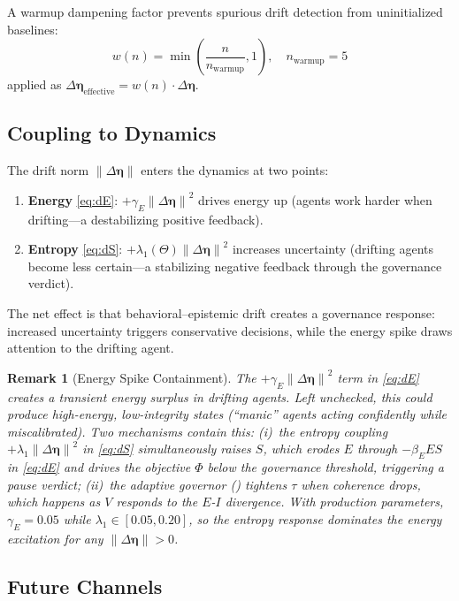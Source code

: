 \documentclass[11pt,twocolumn]{article}
\newtheorem{remark}[theorem]{Remark}
\newcommand{\norm}[1]{\left\lVert #1 \right\rVert}
\newcommand{\deta}{\ensuremath{\Delta\bm{\eta}}}
\begin{document}
A warmup dampening factor prevents spurious drift detection from
uninitialized baselines:
\begin{equation}
  w(n) = \min\left(\frac{n}{n_{\text{warmup}}}, 1\right),
  \quad n_{\text{warmup}} = 5
  \label{eq:warmup}
\end{equation}
applied as $\deta_{\text{effective}} = w(n) \cdot \deta$.

\subsection{Coupling to Dynamics}

The drift norm $\norm{\deta}$ enters the dynamics at two points:
\begin{enumerate}
\item \textbf{Energy} \eqref{eq:dE}: $+\gamma_E\norm{\deta}^2$
  drives energy up (agents work harder when drifting---a destabilizing
  positive feedback).
\item \textbf{Entropy} \eqref{eq:dS}:
  $+\lambda_1(\Theta)\norm{\deta}^2$ increases uncertainty (drifting
  agents become less certain---a stabilizing negative feedback through
  the governance verdict).
\end{enumerate}

The net effect is that behavioral--epistemic drift creates a
governance response: increased uncertainty triggers conservative
decisions, while the energy spike draws attention to the drifting
agent.

\begin{remark}[Energy Spike Containment]
The $+\gamma_E\norm{\deta}^2$ term in \eqref{eq:dE} creates a
transient energy surplus in drifting agents. Left unchecked, this
could produce high-energy, low-integrity states (``manic'' agents
acting confidently while miscalibrated). Two mechanisms contain this:
(i)~the entropy coupling $+\lambda_1\norm{\deta}^2$ in \eqref{eq:dS}
simultaneously raises $S$, which erodes $E$ through $-\beta_E ES$ in
\eqref{eq:dE} and drives the objective $\Phi$ below the governance
threshold, triggering a pause verdict; (ii)~the adaptive governor
() tightens $\tau$ when coherence drops, which
happens as $V$ responds to the $E$-$I$ divergence. With production
parameters, $\gamma_E = 0.05$ while $\lambda_1 \in [0.05, 0.20]$,
so the entropy response dominates the energy excitation for any
$\norm{\deta} > 0$.
\end{remark}

\subsection{Future Channels}
\end{document}
